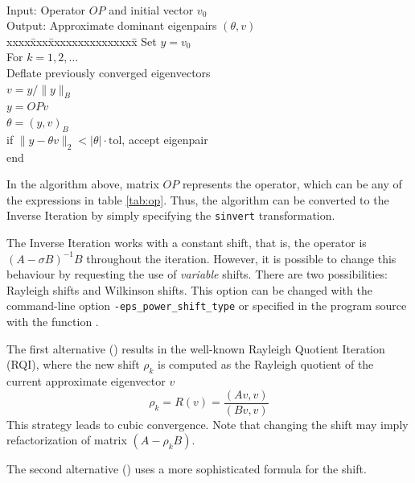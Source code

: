 \begin{algorithm}~\rm
\begin{tabbing}
Input: Operator $O\!P$ and initial vector $v_0$\\
Output: Approximate dominant eigenpairs $(\theta,v)$ \\
xxxx\=xxx\=xxxxxxxxxxxxxxx\=\kill
\> Set $y=v_0$\\
\> For $k=1,2,\ldots$\\
\> \> Deflate previously converged eigenvectors \\
\> \> $v=y/\|y\|_B$ \\
\> \> $y=O\!Pv$ \\
\> \> $\theta=(y,v)_B$ \\
\> \> if $\|y-\theta v\|_2 < |\theta| \cdot \mathrm{tol}$, accept eigenpair \\
\> end
\end{tabbing}
\end{algorithm}
In the algorithm above, matrix $O\!P$ represents the operator, which can be any of the expressions in table \ref{tab:op}. Thus, the algorithm can be converted to the Inverse Iteration by simply specifying the \texttt{sinvert} transformation.

The Inverse Iteration works with a constant shift, that is, the operator is $(A-\sigma B)^{-1}B$ throughout the iteration. However, it is possible to change this behaviour by requesting the use of \emph{variable} shifts. There are two possibilities: Rayleigh shifts and Wilkinson shifts. This option can be changed with the command-line option \Verb!-eps_power_shift_type! or specified in the program source with the function . 

The first alternative () results in the well-known Rayleigh Quotient Iteration (RQI), where the new shift $\rho_k$ is computed as the Rayleigh quotient of the current approximate eigenvector $v$
\begin{equation}
\rho_k=R(v)=\frac{(Av,v)}{(Bv,v)}
\end{equation}
This strategy leads to cubic convergence. Note that changing the shift may imply refactorization of matrix $(A-\rho_k B)$.

The second alternative () uses a more sophisticated formula for the shift.

\section{}

